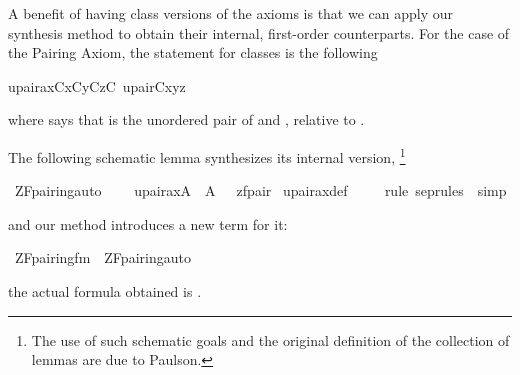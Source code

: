 A benefit of having class versions of the axioms is that we can
apply our synthesis method to obtain their internal, first-order
counterparts. %
For the case of the Pairing Axiom, the statement for classes is the
following
\begin{isabelle}
upair{\isacharunderscore}ax{\isacharparenleft}C{\isacharparenright}{\isacharequal}{\isacharequal}{\isasymforall}x{\isacharbrackleft}C{\isacharbrackright}{\isachardot}{\isasymforall}y{\isacharbrackleft}C{\isacharbrackright}{\isachardot}{\isasymexists}z{\isacharbrackleft}C{\isacharbrackright}{\isachardot}\ upair{\isacharparenleft}C{\isacharcomma}x{\isacharcomma}y{\isacharcomma}z{\isacharparenright}
\end{isabelle}
where  says that  is the unordered pair of
 and , relative to .

The following schematic lemma synthesizes its internal version,%
\footnote{The use of such schematic goals and the original definition
  of the collection of lemmas  are due to Paulson.}
\begin{isabelle}
\isamarkupfalse%
\ ZF{\isacharunderscore}pairing{\isacharunderscore}auto{\isacharcolon}\isanewline
\ \ \ \ {\isachardoublequoteopen}upair{\isacharunderscore}ax{\isacharparenleft}{\isacharhash}{\isacharhash}A{\isacharparenright}\ {\isasymlongleftrightarrow}\ {\isacharparenleft}A{\isacharcomma}\ {\isacharbrackleft}{\isacharbrackright}\ {\isasymTurnstile}\ {\isacharquery}zfpair{\isacharparenright}{\isachardoublequoteclose}\isanewline
{}\isamarkupfalse%
\ upair{\isacharunderscore}ax{\isacharunderscore}def\ \isanewline
\ \ \isamarkupfalse%
\ {\isacharparenleft}{\isacharparenleft}rule\ sep{\isacharunderscore}rules\ {\isacharbar}\ simp{\isacharparenright}{\isacharplus}{\isacharparenright}
\end{isabelle}
and
our  method introduces a new term
 for it:
\begin{isabelle}
\isamarkupfalse%
\ {\isachardoublequoteopen}ZF{\isacharunderscore}pairing{\isacharunderscore}fm{\isachardoublequoteclose}\ \ {\isachardoublequoteopen}ZF{\isacharunderscore}pairing{\isacharunderscore}auto{\isachardoublequoteclose}%
\end{isabelle}
the actual formula obtained is
.

